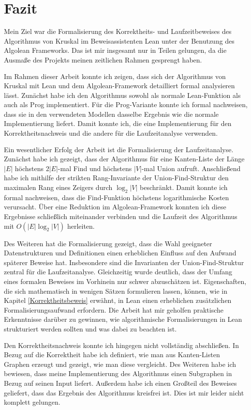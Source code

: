 \section{Fazit}

Mein Ziel war die Formalisierung des Korrektheits- und Laufzeitbeweises des Algorithmus von Kruskal im Beweisassistenten Lean unter der Benutzung des Algolean Frameworks.
Das ist mir insgesamt nur in Teilen gelungen, da die Ausmaße des Projekts meinen zeitlichen Rahmen gesprengt haben.

Im Rahmen dieser Arbeit konnte ich zeigen, dass sich der Algorithmus von Kruskal mit Lean und dem Algolean-Framework detailliert formal analysieren lässt.
Zunächst habe ich den Algorithmus sowohl als normale Lean-Funktion als auch als Prog implementiert.
Für die Prog-Variante konnte ich formal nachweisen, dass sie in den verwendeten Modellen dasselbe Ergebnis wie die normale Implementierung liefert.
Damit konnte ich, die eine Implementierung für den Korrektheitsnachweis und die andere für die Laufzeitanalyse verwenden.

Ein wesentlicher Erfolg der Arbeit ist die Formalisierung der Laufzeitanalyse.
Zunächst habe ich gezeigt, dass der Algorithmus für eine Kanten-Liste der Länge $|E|$ höchstens $2|E|$-mal Find und höchstens $|V|$-mal Union aufruft.
Anschließend habe ich mithilfe der strikten Rang-Invariante der Union-Find-Struktur den maximalen Rang eines Zeigers durch $\log_2|V|$ beschränkt.
Damit konnte ich formal nachweisen, dass die Find-Funktion höchstens logarithmische Kosten verursacht.
Über eine Reduktion im Algolean-Framework konnten ich diese Ergebnisse schließlich miteinander verbinden und die Laufzeit des Algorithmus mit $O(|E|\log_2|V|)$ herleiten.

Des Weiteren hat die Formalisierung gezeigt, dass die Wahl geeigneter Datenstrukturen und Definitionen einen erheblichen Einfluss auf den Aufwand späterer Beweise hat.
Insbesondere sind die Invarianten der Union-Find-Struktur zentral für die Laufzeitanalyse.
Gleichzeitig wurde deutlich, dass der Umfang eines formalen Beweises im Vorhinein nur schwer abzuschätzen ist.
Eigenschaften, die sich mathematisch in wenigen Sätzen formulieren lassen, können, wie in Kapitel \ref{Korrektheitsbeweis} erwähnt, in Lean einen erheblichen zusätzlichen Formalisierungsaufwand erfordern.
Die Arbeit hat mir geholfen praktische Erkenntnisse darüber zu gewinnen, wie algorithmische Formalisierungen in Lean strukturiert werden sollten und was dabei zu beachten ist.

Den Korrektheitsnachweis konnte ich hingegen nicht vollständig abschließen.
In Bezug auf die Korrektheit habe ich definiert, wie man aus Kanten-Listen Graphen erzeugt und gezeigt, wie man diese vergleicht.
Des Weiteren habe ich bewiesen, dass meine Implementierung des Algorithmus einen Subgraphen in Bezug auf seinen Input liefert.
Außerdem habe ich einen Großteil des Beweises geliefert, dass das Ergebnis des Algorithmus kreisfrei ist.
Dies ist mir leider nicht komplett gelungen.

